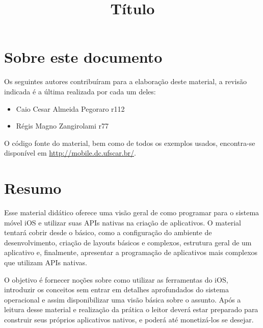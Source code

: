 \documentclass[a4paper,12pt,brazil,oneside]{book}
\title{Título}
\begin{document}



\pagestyle{empty}

\clearpage

\onehalfspace

\pagestyle{plain}

\chapter*{Sobre este documento}
Os seguintes autores contribuíram para a elaboração deste material, a revisão indicada é a última realizada por cada um deles:
  \begin{itemize}
	\item Caio Cesar Almeida Pegoraro \dotfill r112
    \item Régis Magno Zangirolami \dotfill r77
  \end{itemize}
O código fonte do material, bem como de todos os exemplos usados, encontra-se disponível em \href{http://mobile.dc.ufscar.br/}{http://mobile.dc.ufscar.br/}.
\thispagestyle{empty}

\chapter*{Resumo}

\begin{singlespace}
Esse material didático oferece uma visão geral de como programar para o sistema móvel iOS e utilizar suas APIs nativas na criação de aplicativos. O material tentará cobrir desde o básico, como a configuração do ambiente de desenvolvimento, criação de layouts básicos e complexos, estrutura geral de um aplicativo e, finalmente, apresentar a programação de aplicativos mais complexos que utilizam APIs nativas.

O objetivo é fornecer noções sobre como utilizar as ferramentas do iOS, introduzir os conceitos sem entrar em detalhes aprofundados do sistema operacional e assim disponibilizar uma visão básica sobre o assunto.
Após a leitura desse material e realização da prática o leitor deverá estar preparado para construir seus próprios aplicativos nativos, e poderá até monetizá-los se desejar.
\end{singlespace}
\thispagestyle{empty}


\setcounter{tocdepth}{1} %
\tableofcontents
\thispagestyle{empty}
\end{document}
